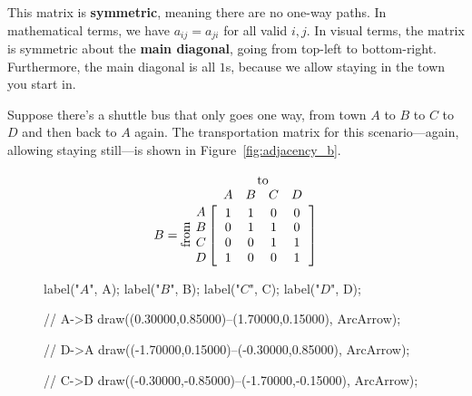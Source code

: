 \documentclass[../textbook.tex]{subfiles}
\begin{document}
\noindent This matrix is \textbf{symmetric}, meaning there are no one-way paths. In mathematical terms, we have $a_{ij}=a_{ji}$ for all valid $i,j$. In visual terms, the matrix is symmetric about the \textbf{main diagonal}, going from top-left to bottom-right. Furthermore, the main diagonal is all $1$s, because we allow staying in the town you start in.

Suppose there's a shuttle bus that only goes one way, from town $A$ to $B$ to $C$ to $D$ and then back to $A$ again. The transportation matrix for this scenario---again, allowing staying still---is shown in Figure~\ref{fig:adjacency_b}.

\begin{figure}[h]
	\begin{center}
		\begin{minipage}[b]{0.45\textwidth}
			\centering
			$$B=\rotatebox[origin=c]{90}{from}\;\,
			  \begin{array}{@{}c@{}}
			    \rowind{A} \\ \rowind{B} \\ \rowind{C} \\ \rowind{D}
			  \end{array}
			  \mathop{\left[
			  \begin{array}{cccc}
			     \colind{1}{A}  &  \colind{1}{B}  &  \colind{0}{C}  & \colind{0}{D} \\
			0 & 1 & 1 & 0 \\
			0 & 0 & 1 & 1 \\
			1 & 0 & 0 & 1 \\
			  \end{array}
			  \right]}^{
			  \begin{array}{@{}c@{}}
			    \rowind{\text{to}} \\ \mathstrut
			  \end{array}
			  }$$
			\vspace*{0.5\baselineskip}
		\end{minipage}
		\hfill
		\begin{minipage}[b]{0.45\textwidth}
			\centering
			\begin{asy}[width=0.7\textwidth]

				label("$A$", A);
				label("$B$", B);
				label("$C$", C);
				label("$D$", D);

				// A->B
				draw((0.30000,0.85000)--(1.70000,0.15000), ArcArrow);

				// D->A
				draw((-1.70000,0.15000)--(-0.30000,0.85000), ArcArrow);

				// C->D
				draw((-0.30000,-0.85000)--(-1.70000,-0.15000), ArcArrow);


\end{asy}
\end{minipage}
\end{center}
\end{figure}
\end{document}

